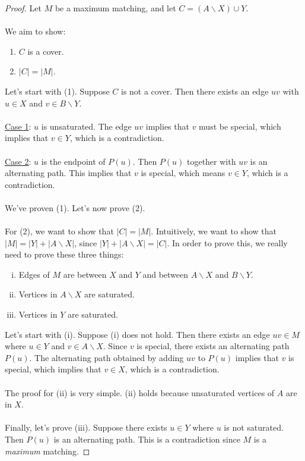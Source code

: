 \documentclass[]{article}
\theoremstyle{definition}
\begin{document}
			\begin{proof}
				Let $M$ be a maximum matching, and let $C = (A \backslash X) \cup Y$.
				\\ \\
				We aim to show:
				\begin{enumerate}
					\item $C$ is a cover.
					\item $|C| = |M|$.
				\end{enumerate}
				
				Let's start with (1). Suppose $C$ is not a cover. Then there exists an edge $uv$ with $u \in X$ and $v \in B \backslash Y$.
				\\ \\
				\underline{Case 1}: $u$ is unsaturated. The edge $uv$ implies that $v$ must be special, which implies that $v \in Y$, which is a contradiction.
				\\ \\
				\underline{Case 2}: $u$ is the endpoint of $P(u)$. Then $P(u)$ together with $uv$ is an alternating path. This implies that $v$ is special, which means $v \in Y$, which is a contradiction.
				\\ \\
				We've proven (1). Let's now prove (2).
				\\ \\
				For (2), we want to show that $|C| = |M|$. Intuitively, we want to show that $|M| = |Y| + |A \backslash X|$, since $|Y| + |A \backslash X| = |C|$. In order to prove this, we really need to prove these three things:
				\begin{enumerate}[(i)]
					\item Edges of $M$ are between $X$ and $Y$ and between $A \backslash X$ and $B \backslash Y$.
					\item Vertices in $A \backslash X$ are saturated.
					\item Vertices in $Y$ are saturated.
				\end{enumerate}
				
				Let's start with (i). Suppose (i) does not hold. Then there exists an edge $uv \in M$ where $u \in Y$ and $v \in A \backslash X$. Since $v$ is special, there exists an alternating path $P(u)$. The alternating path obtained by adding $uv$ to $P(u)$ implies that $v$ is special, which implies that $v \in X$, which is a contradiction.
				\\ \\
				The proof for (ii) is very simple. (ii) holds because unsaturated vertices of $A$ are in $X$.
				\\ \\
				Finally, let's prove (iii). Suppose there exists $u \in Y$ where $u$ is not saturated. Then $P(u)$ is an alternating path. This is a contradiction since $M$ is a \emph{maximum} matching.
			\end{proof}
			
\end{document}
